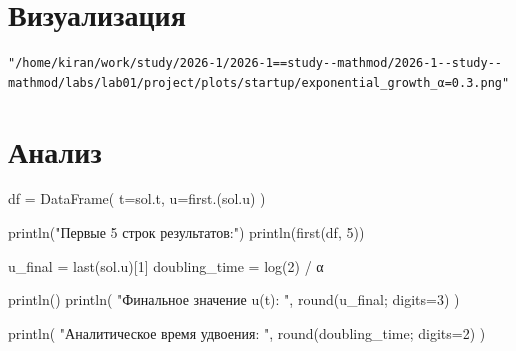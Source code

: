 \documentclass[
  russian,
  12pt,
  a4paper,
  DIV=11,
  numbers=noendperiod]{scrreprt}
\newenvironment{Shaded}{\begin{snugshade}}{\end{snugshade}}
\newcommand{\FloatTok}[1]{\textcolor[rgb]{0.68,0.00,0.00}{#1}}
\newcommand{\FunctionTok}[1]{\textcolor[rgb]{0.28,0.35,0.67}{#1}}
\newcommand{\NormalTok}[1]{\textcolor[rgb]{0.00,0.23,0.31}{#1}}
\newcommand{\OperatorTok}[1]{\textcolor[rgb]{0.37,0.37,0.37}{#1}}
\newcommand{\SpecialCharTok}[1]{\textcolor[rgb]{0.37,0.37,0.37}{#1}}
\newcommand{\StringTok}[1]{\textcolor[rgb]{0.13,0.47,0.30}{#1}}
\begin{document}
\section{Визуализация}\label{ux432ux438ux437ux443ux430ux43bux438ux437ux430ux446ux438ux44f}

\begin{Shaded}
\end{Shaded}

\begin{verbatim}
"/home/kiran/work/study/2026-1/2026-1==study--mathmod/2026-1--study--mathmod/labs/lab01/project/plots/startup/exponential_growth_α=0.3.png"
\end{verbatim}

\section{Анализ}\label{ux430ux43dux430ux43bux438ux437}

\begin{Shaded}
\begin{Highlighting}[]
\NormalTok{df }\OperatorTok{=} \FunctionTok{DataFrame}\NormalTok{(}
\NormalTok{    t}\OperatorTok{=}\NormalTok{sol.t,}
\NormalTok{    u}\OperatorTok{=}\FunctionTok{first}\NormalTok{.(sol.u)}
\NormalTok{)}

\FunctionTok{println}\NormalTok{(}\StringTok{"Первые 5 строк результатов:"}\NormalTok{)}
\FunctionTok{println}\NormalTok{(}\FunctionTok{first}\NormalTok{(df, }\FloatTok{5}\NormalTok{))}

\NormalTok{u\_final }\OperatorTok{=} \FunctionTok{last}\NormalTok{(sol.u)[}\FloatTok{1}\NormalTok{]}
\NormalTok{doubling\_time }\OperatorTok{=} \FunctionTok{log}\NormalTok{(}\FloatTok{2}\NormalTok{) }\OperatorTok{/}\NormalTok{ α}

\FunctionTok{println}\NormalTok{()}
\FunctionTok{println}\NormalTok{(}
    \StringTok{"Финальное значение u(t): "}\NormalTok{,}
    \FunctionTok{round}\NormalTok{(u\_final; digits}\OperatorTok{=}\FloatTok{3}\NormalTok{)}
\NormalTok{)}

\FunctionTok{println}\NormalTok{(}
    \StringTok{"Аналитическое время удвоения: "}\NormalTok{,}
    \FunctionTok{round}\NormalTok{(doubling\_time; digits}\OperatorTok{=}\FloatTok{2}\NormalTok{)}
\NormalTok{)}
\end{Highlighting}
\end{Shaded}
\end{document}
